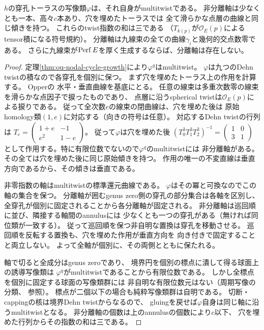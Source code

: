 \begin{theorem}[節点cycleの写像類の精密化]
\label{thm:ou-nodal-multitwist-refinement}
$h$の穿孔トーラスの写像類$\varphi$は、それ自身がmultitwistである。
非分離軸は少なくとも一本、高々$c$本あり、穴を埋めたトーラスでは
全て滑らかな点層の曲線と同じ傾きを持つ。
これらのtwist指数の和は三である
（$T_{k(p)}$が$\mathcal O_E(p)$によるtensor積になる符号規約）。
分離軸は九線束の全ての曲線$\gamma_i$と幾何的交点数零である。
さらに九線束が$\operatorname{Perf} E$を厚く生成するならば、分離軸は存在しない。
\end{theorem}
\begin{proof}
定理\ref{thm:ou-nodal-cycle-growth}により$\varphi^q$はmultitwist。
$\varphi$は九つのDehn twistの積なので各穿孔を個別に保つ。
まず穴を埋めたトーラス上の作用を計算する。
Opper\cite[Example~4.7, Proposition~6.11]{Opper2026}の
水平・垂直曲線を基底にとる。
任意の線束は多重次数零の線束を滑らかな点因子で捩ったものであり、
点層に沿うspherical twistは$\mathcal O_E(p)$による捩りである。
従って全次数$e$の線束の閉曲線は、穴を埋めた後は
原始homology類$(1,e)$に対応する（向きの符号は任意）。
対応するDehn twistの行列は
$T_e=\left(\begin{smallmatrix}1+e&-1\\e^2&1-e\end{smallmatrix}\right)$。
従って$\varphi$は穴を埋めた後
$(T_0^3T_1^3T_2^3)^{-1}=\left(\begin{smallmatrix}1&0\\3&1\end{smallmatrix}\right)$
として作用する。特に有限位数でないので$\varphi^q$のmultitwistには
非分離軸がある。その全ては穴を埋めた後に同じ原始傾きを持つ。
作用の唯一の不変直線は垂直方向であるから、その傾きは垂直である。

非零指数の軸はmultitwistの標準還元曲線である。
$\varphi$はその冪と可換なのでこの軸の集合を保つ。
分離軸が囲むgenus zero側の穿孔の部分集合は各軸を区別し、
全穿孔が個別に固定されることから各分離軸が固定される。
非分離軸は巡回順に並び、隣接する軸間のannulusには
少なくとも一つの穿孔がある（無ければ同位類が一致する）。
従って巡回順を保つ非自明な置換は穿孔を移動させる。
巡回順を反転する置換も、穴を埋めた作用が垂直方向を
向き付きで固定することと両立しない。
よって全軸が個別に、その両側とともに保たれる。

軸で切ると全成分はgenus zeroであり、
境界円を個別の標点に潰して得る球面上の誘導写像類は
$\varphi^q$がmultitwistであることから有限位数である。
しかし全標点を個別に固定する球面の写像類群には
非自明な有限位数元はない（周期写像の分類、
\cite[Chapter~7]{FarbMargalit2012}参照）。
標点が二個以下の場合も純粋写像類群は自明である。
切断・cappingの核は境界Dehn twistからなるので、
gluingを戻せば$\varphi$自身は同じ軸に沿うmultitwistとなる。
非分離軸の個数は上のannulusの個数により$c$以下、
穴を埋めた行列からその指数の和は三である。


\end{proof}
